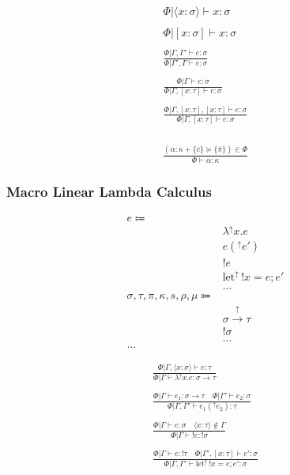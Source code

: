 \documentclass {article}
\begin{document}
\begin{gather*}
\Phi | \langle x : \sigma \rangle \vdash x : \sigma \\
\\
\Phi | [ x : \sigma ] \vdash x : \sigma \\
\\
\frac
{\Phi | \Gamma, \Gamma' \vdash e : \sigma}
{\Phi | \Gamma', \Gamma \vdash e : \sigma} \\
\\
\frac
{\Phi | \Gamma \vdash e : \sigma}
{\Phi | \Gamma, [ x : \tau ] \vdash e : \sigma } \\
\\
\frac
{\Phi | \Gamma, [x : \tau], [x : \tau] \vdash e : \sigma}
{\Phi | \Gamma, [x : \tau] \vdash e : \sigma } \\
\end{gather*}

\begin{gather*}
\frac
{(\alpha : \kappa + \{ \overline c \} \succeq \{ \overline \pi \} ) \in \Phi}
{\Phi \vdash \alpha : \kappa}
\end{gather*}

\subsubsection{Macro Linear Lambda Calculus}
\begin{align*}
e \Coloneqq & \\
& \lambda^\uparrow x. e \tag{Macro Lambda}\\
& e(^\uparrow e') \tag{Macro Application}\\
& !e \tag{Bang Introduction} \\
& \text{let}^\uparrow \, !x = e; e' \tag{Bang Elimination} \\
& \dots \\
\sigma, \tau, \pi, \kappa, s, \rho, \mu \Coloneqq & \\
& \sigma \xrightarrow{\uparrow} \tau \tag{Macro} \\
& !\sigma \tag{Bang} \\
& \dots \\
\dots
\end{align*}

\begin{gather*}
\frac
{\Phi | \Gamma, \langle x : \sigma \rangle \vdash e : \tau}
{\Phi | \Gamma \vdash \lambda^\uparrow x. e : \sigma \to \tau } \\
\\
\frac
{\Phi | \Gamma \vdash e_1 : \sigma \to \tau \quad \Phi | \Gamma' \vdash e_2 : \sigma}
{\Phi | \Gamma, \Gamma' \vdash e_1(^\uparrow e_2) : \tau} \\
\\
\frac
{\Phi | \Gamma \vdash e : \sigma \quad \langle x : \tau \rangle \notin \Gamma }
{\Phi | \Gamma \vdash !e : !\sigma } \\
\\
\frac
{\Phi | \Gamma \vdash e : !\tau \quad \Phi | \Gamma', [x : \tau] \vdash e' : \sigma }
{\Phi | \Gamma, \Gamma' \vdash \text{let}^\uparrow \, !x = e; e' : \sigma}  \\
\end{gather*}
\end{document}
